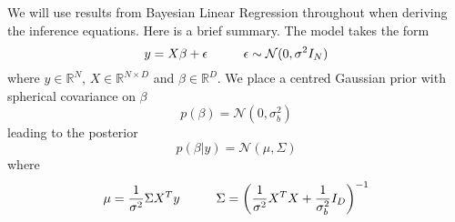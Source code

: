\documentclass[a4paper,10pt]{article}
\begin{document}
We will use results from Bayesian Linear Regression throughout when deriving the inference equations. Here is a brief summary.
The model takes the form
\begin{equation}
y=X\beta + \epsilon \hspace{10 mm} \epsilon \sim \mathcal{N}(0,\sigma^2 I_N)
\end{equation}
where $y \in \mathbb{R}^N$, $X \in \mathbb{R}^{N \times D}$ and $\beta \in \mathbb{R}^D$. We place a centred Gaussian prior with spherical covariance on $\beta$
\begin{equation}
p(\beta)=\mathcal{N}(0,\sigma_b ^2)
\end{equation}
leading to the posterior
\begin{equation}
p(\beta | y)=\mathcal{N}(\mu,\Sigma)
\end{equation}
where
\begin{equation}
\mu=\frac{1}{\sigma^2}\Sigma X^T y  \hspace{10 mm} \Sigma=\bigg( \frac{1}{\sigma^2}X^T X + \frac{1}{\sigma_b^2}I_D \bigg) ^{-1}
\end{equation}
\end{document}
